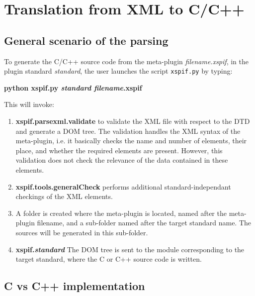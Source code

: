 

\chapter{Translation from XML to C/C++}

\section{General scenario of the parsing}

\noindent To generate the C/C++ source code from the meta-plugin \emph{filename.xspif}, in the plugin standard \emph{standard}, the user launches the script \verb|xspif.py| by typing:

\begin{center}
\textbf{python xspif.py \textit{standard filename}.xspif}
\end{center}

\noindent This will invoke:
\begin{enumerate}
\item \textbf{xspif.parsexml.validate} to validate the XML file with respect to the DTD and generate a DOM tree. The validation handles the XML syntax of the meta-plugin, i.e. it basically checks the name and number of elements, their place, and whether the required elements are present. However, this validation does not check the relevance of the data contained in these elements.
\item \textbf{xspif.tools.generalCheck} performs additional standard-independant checkings of the XML elements.
\item A folder is created where the meta-plugin is located, named after the meta-plugin filename, and a sub-folder named after the target standard name. The sources will be generated in this sub-folder.
\item \textbf{xspif.\textit{standard}} The DOM tree is sent to the module corresponding to the target standard, where the C or C++ source code is written.
\end{enumerate}

\section{C vs C++ implementation}\label{CvsCplus}

